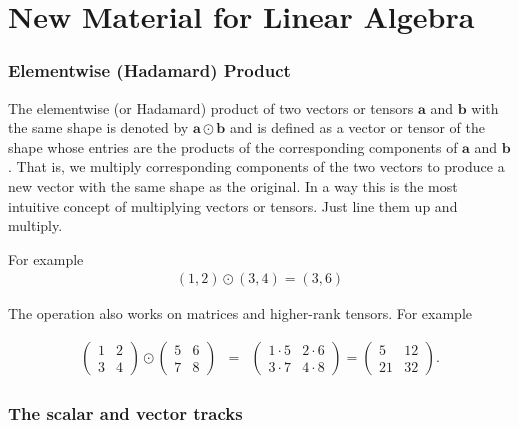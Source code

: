 \chapter{New Material for Linear Algebra}



\subsection{Elementwise (Hadamard) Product}\label{hadamard}

The elementwise (or Hadamard) product of two vectors or tensors $\mathbf{a}$ and $\mathbf{b}$ with the same shape is denoted by $\mathbf{a} \odot \mathbf{b}$ and is defined as a vector or tensor of the shape whose entries are the products of the corresponding components of $\mathbf{a}$  and $\mathbf{b}$. That is, we multiply corresponding components of the two vectors to produce a new vector with the same shape as the original. In a way this is the most intuitive concept of multiplying vectors or tensors. Just line them up and multiply.

For example
\begin{eqnarray}
(1,2) \odot (3,4) = (3,6)
\end{eqnarray}

The operation also works on matrices and higher-rank tensors. For example

\begin{eqnarray}
\begin{pmatrix} 1 & 2 \\ 3 & 4 \end{pmatrix} \odot \begin{pmatrix} 5 & 6 \\ 7 & 8 \end{pmatrix} &=& \begin{pmatrix} 1 \cdot 5 & 2 \cdot 6 \\ 3 \cdot 7 & 4 \cdot 8 \end{pmatrix} = \begin{pmatrix} 5 & 12 \\ 21 & 32 \end{pmatrix}.
\end{eqnarray}


\subsection{The scalar and vector tracks}\label{scalarVectorTracks}

